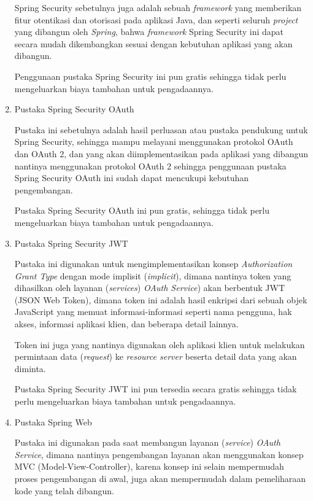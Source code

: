 \documentclass[pdftex,12pt, oneside]{article}
\begin{document}
\begin{enumerate}
	Spring Security sebetulnya juga adalah sebuah \textit{framework} yang memberikan fitur otentikasi dan otorisasi pada aplikasi Java, dan seperti seluruh \textit{project} yang dibangun oleh \textit{Spring}, bahwa \textit{framework} Spring Security ini dapat secara mudah dikembangkan sesuai dengan kebutuhan aplikasi yang akan dibangun.
	
	Penggunaan pustaka Spring Security ini pun gratis sehingga tidak perlu mengeluarkan biaya tambahan untuk pengadaannya.
	
	\item Pustaka Spring Security OAuth
	
	Pustaka ini sebetulnya adalah hasil perluasan atau pustaka pendukung untuk Spring Security, sehingga mampu melayani menggunakan protokol OAuth dan OAuth 2, dan yang akan diimplementasikan pada aplikasi yang dibangun nantinya menggunakan protokol OAuth 2 sehingga penggunaan pustaka Spring Security OAuth ini sudah dapat mencukupi kebutuhan pengembangan.
	
	Pustaka Spring Security OAuth ini pun gratis, sehingga tidak perlu mengeluarkan biaya tambahan untuk pengadaannya.
	
	\item Pustaka Spring Security JWT
	
	Pustaka ini digunakan untuk mengimplementasikan konsep \textit{Authorization Grant Type} dengan mode implisit (\textit{implicit}), dimana nantinya token yang dihasilkan oleh layanan (\textit{services}) \textit{OAuth Service}) akan berbentuk JWT (JSON Web Token), dimana token ini adalah hasil enkripsi dari sebuah objek JavaScript yang memuat informasi-informasi seperti nama pengguna, hak akses, informasi aplikasi klien, dan beberapa detail lainnya. 
	
	Token ini juga yang nantinya digunakan oleh aplikasi klien untuk melakukan permintaan data (\textit{request}) ke \textit{resource server} beserta detail data yang akan diminta.
	
	Pustaka Spring Security JWT ini pun tersedia secara gratis sehingga tidak perlu mengeluarkan biaya tambahan untuk pengadaannya.
	
	\item Pustaka Spring Web
	
	Pustaka ini digunakan pada saat membangun layanan (\textit{service}) \textit{OAuth Service}, dimana nantinya pengembangan layanan akan menggunakan konsep MVC (Model-View-Controller), karena konsep ini selain mempermudah proses pengembangan di awal, juga akan mempermudah dalam pemeliharaan kode yang telah dibangun.
	

\end{enumerate}
\end{document}
